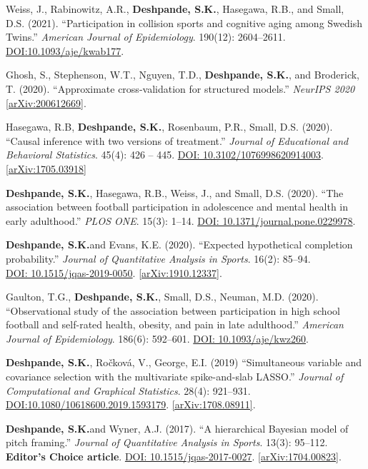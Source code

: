 \documentclass[margin]{res}
\def\skd{\textbf{Deshpande, S.K.}}
\begin{document}
\begin{resume}
Weiss, J., Rabinowitz, A.R., \skd, Hasegawa, R.B., and Small, D.S. (2021). ``Participation in collision sports and cognitive aging among Swedish Twins.'' \textit{American Journal of Epidemiology}. 190(12): 2604--2611. \href{https://doi.org/10.1093/aje/kwab177}{DOI:10.1093/aje/kwab177}.

Ghosh, S., Stephenson, W.T., Nguyen, T.D., \skd, and Broderick, T. (2020). ``Approximate cross-validation for structured models.'' \textit{NeurIPS 2020} \href{https://arxiv.org/abs/2006.12669}{[arXiv:200612669]}. 

Hasegawa, R.B, \skd, Rosenbaum, P.R., Small, D.S. (2020). ``Causal inference with two versions of treatment.'' \textit{Journal of Educational and Behavioral Statistics}. 45(4): 426 -- 445. \href{https://doi.org/10.3102/1076998620914003}{DOI: 10.3102/1076998620914003}. \href{https://arxiv.org/abs/1705.03918}{[arXiv:1705.03918]}

\skd, Hasegawa, R.B., Weiss, J., and Small, D.S. (2020). ``The association between football participation in adolescence and mental health in early adulthood.'' \textit{PLOS ONE}. 15(3): 1--14. \href{https://doi.org/10.1371/journal.pone.0229978}{DOI: 10.1371/journal.pone.0229978}.

\skd and Evans, K.E. (2020). ``Expected hypothetical completion probability.'' \textit{Journal of Quantitative Analysis in Sports}. 16(2): 85--94.\\ \href{https://doi.org/10.1515/jqas-2019-0050}{DOI: 10.1515/jqas-2019-0050}. \href{https://arxiv.org/abs/1910.12337}{[arXiv:1910.12337]}.

Gaulton, T.G., \skd, Small, D.S., Neuman, M.D. (2020). ``Observational study of the association between participation in high school football and self-rated health, obesity, and pain in late adulthood.'' \textit{American Journal of Epidemiology}. 186(6): 592--601. \href{https://doi.org/10.1093/aje/kwz260}{DOI: 10.1093/aje/kwz260}.

\skd, Ro\v{c}kov\'{a}, V.,  George, E.I. (2019) ``Simultaneous variable and covariance selection with the multivariate spike-and-slab LASSO.'' \textit{Journal of Computational and Graphical Statistics}. 28(4): 921--931. \href{https://doi.org/10.1080/10618600.2019.1593179}{DOI:10.1080/10618600.2019.1593179}. \href{https://arxiv.org/abs/1708.08911}{[arXiv:1708.08911]}. %

\skd and Wyner, A.J. (2017). ``A hierarchical Bayesian model of pitch framing.'' \textit{Journal of Quantitative Analysis in Sports}. 13(3): 95--112. \textbf{Editor's Choice article}.   \href{https://doi.org/10.1515/jqas-2017-0027}{DOI: 10.1515/jqas-2017-0027}. \href{https://arxiv.org/abs/1704.00823}{[arXiv:1704.00823]}.


\end{resume}
\end{document}

